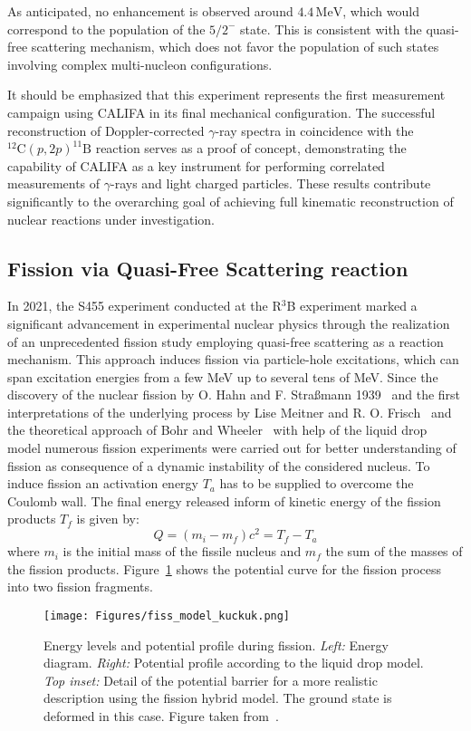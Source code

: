 As anticipated, no enhancement is observed around $4.4\,\mathrm{MeV}$, which would correspond to the population of the $5/2^-$ state. This is consistent with the quasi-free scattering mechanism, which does not favor the population of such states involving complex multi-nucleon configurations.

It should be emphasized that this experiment represents the first measurement campaign using CALIFA in its final mechanical configuration. The successful reconstruction of Doppler-corrected $\gamma$-ray spectra in coincidence with the $^{12}\mathrm{C}(p,2p)^{11}\mathrm{B}$ reaction serves as a proof of concept, demonstrating the capability of CALIFA as a key instrument for performing correlated measurements of $\gamma$-rays and light charged particles. These results contribute significantly to the overarching goal of achieving full kinematic reconstruction of nuclear reactions under investigation.


\subsection{Fission via Quasi-Free Scattering reaction}\label{sec:fission_qfs}
In 2021, the S455 experiment conducted at the R$^3$B experiment marked a significant advancement in experimental nuclear physics through the realization of an unprecedented fission study employing quasi-free scattering as a reaction mechanism. This approach induces fission via particle-hole excitations, which can span excitation energies from a few MeV up to several tens of MeV.\newline
Since the discovery of the nuclear fission by O. Hahn and F. Stra{\ss}mann 1939~\cite{hahn1939nachweis} and the first interpretations of the underlying process by Lise Meitner and R. O. Frisch~\cite{meitner1939disintegration} and the theoretical approach of Bohr and Wheeler~\cite{bohr1939phys} with help of the liquid drop model numerous fission experiments were carried out for better understanding of fission as consequence of a dynamic instability of the considered nucleus.\newline
To induce fission an activation energy $T_a$ has to be supplied to overcome the Coulomb wall. The final energy released inform of kinetic energy of the fission products $T_f$ is given by:
\[
Q = (m_i -m_f)c^2 = T_f - T_a
\]
where $m_i$ is the initial mass of the fissile nucleus and $m_f$ the sum of the masses of the fission products. Figure~\ref{fig:fission_kuckuk} shows the potential curve for the fission process into two fission fragments.\newline
\begin{figure}[htpb]
    \centering
    \texttt{[image: Figures/fiss\_model\_kuckuk.png]}
    \caption{
Energy levels and potential profile during fission. \textit{Left:} Energy diagram. \textit{Right:} Potential profile according to the liquid drop model. \textit{Top inset:} Detail of the potential barrier for a more realistic description using the fission hybrid model. The ground state is deformed in this case. Figure taken from~\cite{mayer2013kernphysik}.
    }
    \label{fig:fission_kuckuk}
\end{figure}

